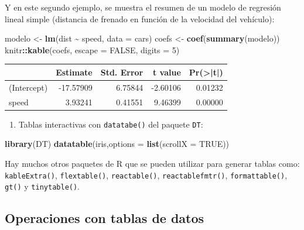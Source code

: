 \documentclass[
]{book}
\newenvironment{Shaded}{\begin{snugshade}}{\end{snugshade}}
\newcommand{\AttributeTok}[1]{\textcolor[rgb]{0.13,0.29,0.53}{#1}}
\newcommand{\ConstantTok}[1]{\textcolor[rgb]{0.56,0.35,0.01}{#1}}
\newcommand{\DecValTok}[1]{\textcolor[rgb]{0.00,0.00,0.81}{#1}}
\newcommand{\FunctionTok}[1]{\textcolor[rgb]{0.13,0.29,0.53}{\textbf{#1}}}
\newcommand{\NormalTok}[1]{#1}
\newcommand{\OtherTok}[1]{\textcolor[rgb]{0.56,0.35,0.01}{#1}}
\newcommand{\SpecialCharTok}[1]{\textcolor[rgb]{0.81,0.36,0.00}{\textbf{#1}}}
\providecommand{\tightlist}{%
  \setlength{\itemsep}{0pt}\setlength{\parskip}{0pt}}
\begin{document}
Y en este segundo ejemplo, se muestra el resumen de un modelo de regresión lineal simple (distancia de frenado en función de la velocidad del vehículo):

\begin{Shaded}
\begin{Highlighting}[]
\NormalTok{modelo }\OtherTok{\textless{}{-}} \FunctionTok{lm}\NormalTok{(dist }\SpecialCharTok{\textasciitilde{}}\NormalTok{ speed, }\AttributeTok{data =}\NormalTok{ cars)}
\NormalTok{coefs }\OtherTok{\textless{}{-}} \FunctionTok{coef}\NormalTok{(}\FunctionTok{summary}\NormalTok{(modelo))}
\NormalTok{knitr}\SpecialCharTok{::}\FunctionTok{kable}\NormalTok{(coefs, }\AttributeTok{escape =} \ConstantTok{FALSE}\NormalTok{, }\AttributeTok{digits =} \DecValTok{5}\NormalTok{)}
\end{Highlighting}
\end{Shaded}

\begin{tabular}{l|r|r|r|r}
\hline
  & Estimate & Std. Error & t value & Pr(>|t|)\\
\hline
(Intercept) & -17.57909 & 6.75844 & -2.60106 & 0.01232\\
\hline
speed & 3.93241 & 0.41551 & 9.46399 & 0.00000\\
\hline
\end{tabular}

\begin{enumerate}
\def\labelenumi{\alph{enumi}.}
\setcounter{enumi}{1}
\tightlist
\item
  Tablas interactivas con \texttt{datatabe()} del paquete \texttt{DT}:
\end{enumerate}

\begin{Shaded}
\begin{Highlighting}[]
\FunctionTok{library}\NormalTok{(DT)}
\FunctionTok{datatable}\NormalTok{(iris,}\AttributeTok{options =} \FunctionTok{list}\NormalTok{(}\AttributeTok{scrollX =} \ConstantTok{TRUE}\NormalTok{))}
\end{Highlighting}
\end{Shaded}

Hay muchos otros paquetes de R que se pueden utilizar para generar tablas como:
\texttt{kableExtra()}, \texttt{flextable()}, \texttt{reactable()}, \texttt{reactablefmtr()},
\texttt{formattable()}, \texttt{gt()} y \texttt{tinytable()}.

\subsection{Operaciones con tablas de datos}\label{operaciones-con-tablas-de-datos}
\end{document}
